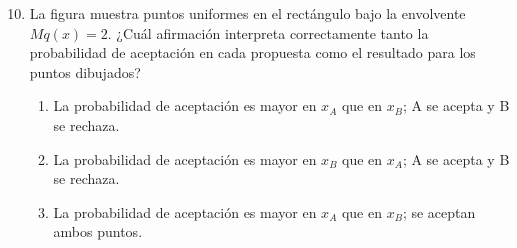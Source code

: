\documentclass[11pt]{article}
\begin{document}
    {}
    {}
\begin{enumerate}
    \setcounter{enumi}{9}
    \setlength{\itemsep}{0.7em}
    \item
    \begin{samepage}
    La figura muestra puntos uniformes en el rectángulo bajo la
    envolvente $Mq(x)=2$. ¿Cuál afirmación interpreta correctamente
    tanto la probabilidad de aceptación en cada propuesta como el
    resultado para los puntos dibujados?
    \begin{enumerate}
        \item La probabilidad de aceptación es mayor en $x_A$ que en
        $x_B$; A se acepta y B se rechaza.
        \item La probabilidad de aceptación es mayor en $x_B$ que en
        $x_A$; A se acepta y B se rechaza.
        \item La probabilidad de aceptación es mayor en $x_A$ que en
        $x_B$; se aceptan ambos puntos.
    \end{enumerate}
\end{samepage}
\end{enumerate}
\endgroup
\end{document}

